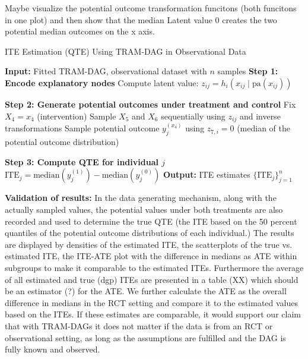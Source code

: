 Maybe visualize the potential outcome transformation funcitons (both funcitons in one plot) and then show that the median Latent value 0 creates the two potential median outcomes on the x axis.



\begin{algorithm}
\caption{ITE Estimation (QTE) Using TRAM-DAG in Observational Data}
\label{alg:ite_qte}
\begin{algorithmic}[1]
\State \textbf{Input:} Fitted TRAM-DAG, observational dataset with $n$ samples
  \State \textbf{Step 1: Encode explanatory nodes}
    \State Compute latent value: $z_{ij} = h_i(x_{ij} \mid \text{pa}(x_{ij}))$
  \EndFor

  \State \textbf{Step 2: Generate potential outcomes under treatment and control}
   
    \State Fix $X_4 = x_4$ (intervention)
    \State Sample $X_5$ and $X_6$ sequentially using $z_{ij}$ and inverse transformations
    \State Sample potential outcome $y_j^{(x_4)}$ using $z_{7,i} = 0$ (median of the potential outcome distribution)

  \EndFor

  \State \textbf{Step 3: Compute QTE for individual $j$}
  \State $\text{ITE}_j = \text{median}(y_j^{(1)}) - \text{median}(y_j^{(0)})$
\EndFor
\State \textbf{Output:} ITE estimates $\{\text{ITE}_j\}_{j=1}^n$
\end{algorithmic}
\end{algorithm}





\textbf{Validation of results: } In the data generating mechanism, along with the actually sampled values, the potential values under both treatments are also recorded and used to determine the true QTE (the ITE based on the 50 percent quantiles of the potential outcome distributions of each individual.)
The results are displayed by densities of the estimated ITE, the scatterplots of the true vs. estimated ITE, the ITE-ATE plot with the difference in medians as ATE within subgroups to make it comparable to the estimated ITEs. Furthermore the average of all estimated and true (dgp) ITEs are presented in a table (XX) which should be an estimator (?) for the ATE. We further calculate the ATE as the overall difference in medians in the RCT setting and compare it to the estimated values based on the ITEs. If these estimates are comparable, it would support our claim that with TRAM-DAGs it does not matter if the data is from an RCT or observational setting, as long as the assumptions are fulfilled and the DAG is fully known and observed.



